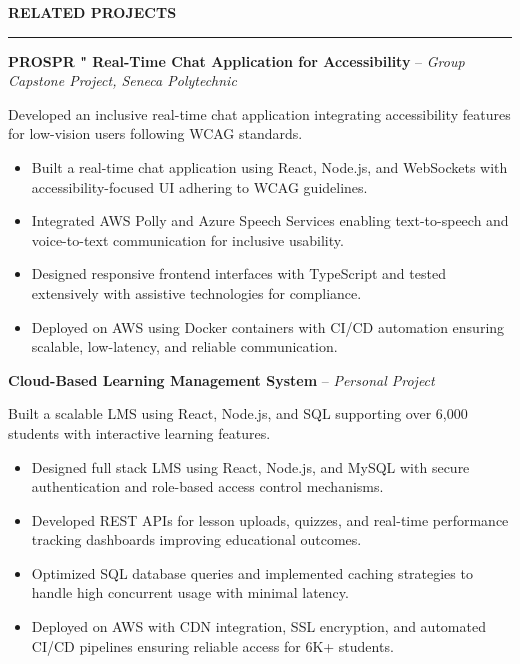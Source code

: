 \documentclass[10pt,letterpaper]{article}
\begin{document}
\vspace{6pt}

\textbf{RELATED PROJECTS}\\[-8pt]
\noindent\rule{\textwidth}{1pt}

\vspace{-2pt}

\textbf{PROSPR " Real-Time Chat Application for Accessibility} -- \emph{Group Capstone Project, Seneca Polytechnic}

\vspace{-1pt}

Developed an inclusive real-time chat application integrating accessibility features for low-vision users following WCAG standards.
\vspace{-1pt}
\begin{itemize}
\item Built a real-time chat application using React, Node.js, and WebSockets with accessibility-focused UI adhering to WCAG guidelines.
\item Integrated AWS Polly and Azure Speech Services enabling text-to-speech and voice-to-text communication for inclusive usability.
\item Designed responsive frontend interfaces with TypeScript and tested extensively with assistive technologies for compliance.
\item Deployed on AWS using Docker containers with CI/CD automation ensuring scalable, low-latency, and reliable communication.
\end{itemize}

\textbf{Cloud-Based Learning Management System} -- \emph{Personal Project}

\vspace{-1pt}

Built a scalable LMS using React, Node.js, and SQL supporting over 6,000 students with interactive learning features.
\vspace{-1pt}
\begin{itemize}
\item Designed full stack LMS using React, Node.js, and MySQL with secure authentication and role-based access control mechanisms.
\item Developed REST APIs for lesson uploads, quizzes, and real-time performance tracking dashboards improving educational outcomes.
\item Optimized SQL database queries and implemented caching strategies to handle high concurrent usage with minimal latency.
\item Deployed on AWS with CDN integration, SSL encryption, and automated CI/CD pipelines ensuring reliable access for 6K+ students.
\end{itemize}
\end{document}

